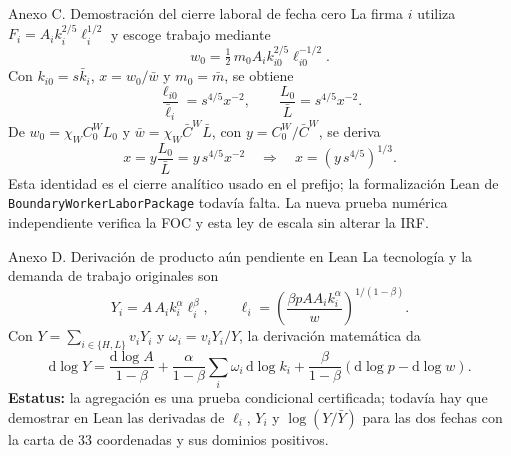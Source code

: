 \documentclass[aspectratio=169,11pt]{beamer}
\begin{document}
\begin{frame}{Anexo C. Demostración del cierre laboral de fecha cero}
\small
La firma $i$ utiliza $F_i=A_i k_i^{2/5}\ell_i^{1/2}$
y escoge trabajo mediante
\[
w_0=\tfrac12\,m_0A_i k_{i0}^{2/5}\ell_{i0}^{-1/2}.
\]
Con $k_{i0}=s\bar k_i$, $x=w_0/\bar w$ y
$m_0=\bar m$, se obtiene
\[
\frac{\ell_{i0}}{\bar\ell_i}=s^{4/5}x^{-2},
\qquad \frac{L_0}{\bar L}=s^{4/5}x^{-2}.
\]
De $w_0=\chi_WC^W_0L_0$ y
$\bar w=\chi_W\bar C^W\bar L$, con
$y=C^W_0/\bar C^W$, se deriva
\[
x=y\frac{L_0}{\bar L}
=y\,s^{4/5}x^{-2}
\quad\Rightarrow\quad
\boxed{x=(y\,s^{4/5})^{1/3}}.
\]
\footnotesize
Esta identidad es el cierre analítico usado en el
prefijo; la formalización Lean de
\texttt{BoundaryWorkerLaborPackage} todavía falta.
La nueva prueba numérica independiente verifica
la FOC y esta ley de escala sin alterar la IRF.
\end{frame}


\begin{frame}{Anexo D. Derivación de producto aún pendiente en Lean}
\small
La tecnología y la demanda de trabajo originales son
\[
Y_i=A\,A_i k_i^{\alpha}\ell_i^{\beta},\qquad
\ell_i=\left(\frac{\beta p A A_i k_i^\alpha}{w}\right)^{1/(1-\beta)}.
\]
Con $Y=\sum_{i\in\{H,L\}}v_iY_i$ y
$\omega_i=v_iY_i/Y$, la derivación matemática da
\[
\mathrm d\log Y
=\frac{\mathrm d\log A}{1-\beta}
+\frac{\alpha}{1-\beta}\sum_i\omega_i\,\mathrm d\log k_i
+\frac{\beta}{1-\beta}(\mathrm d\log p-\mathrm d\log w).
\]
\medskip
\footnotesize
\textbf{Estatus:} la agregación es una prueba condicional
certificada; todavía hay que demostrar en Lean las derivadas
de $\ell_i$, $Y_i$ y $\log(Y/\bar Y)$ para las dos fechas
con la carta de 33 coordenadas y sus dominios positivos.
\end{frame}
\end{document}
